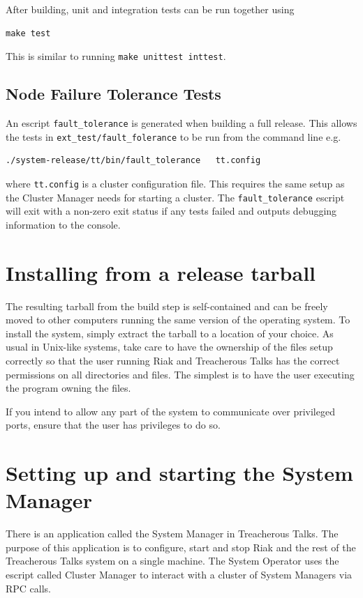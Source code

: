 \documentclass[11pt,a4paper]{report}
\begin{document}
After building, unit and integration tests can be run together using

\begin{Verbatim}
make test
\end{Verbatim}

This is similar to running {\tt make unittest inttest}.

\subsection{Node Failure Tolerance Tests}\label{run_fault_tolerance}

An escript\cite{escript} {\tt fault\_tolerance} is generated when building a full release. This
allows the tests in {\tt ext\_test/fault\_folerance} to be run from the command
line e.g.

\begin{Verbatim}
./system-release/tt/bin/fault_tolerance   tt.config
\end{Verbatim}

where {\tt tt.config} is a cluster configuration file. This requires the same
setup as the Cluster Manager needs for starting a cluster. The
{\tt fault\_tolerance} escript will exit with a non-zero exit status if any tests
failed and outputs debugging information to the console.

\section{Installing from a release tarball}
\label{sec:installing}
The resulting tarball from the build step is self-contained and can be freely
moved to other computers running the same version of the operating system. To
install the system, simply extract the tarball to a location of your choice. As
usual in Unix-like systems, take care to have the ownership of the files setup
correctly so that the user running Riak and Treacherous Talks has the correct
permissions on all directories and files. The simplest is to have the user
executing the program owning the files.

If you intend to allow any part of the system to communicate over privileged
ports, ensure that the user has privileges to do so.
\section{Setting up and starting the System Manager}
There is an application called the System Manager in Treacherous Talks. The
purpose of this application is to configure, start and stop Riak and the rest of
the Treacherous Talks system on a single machine. The System Operator uses the
escript called Cluster Manager to interact with a cluster of System Managers via
RPC calls.
\end{document}
